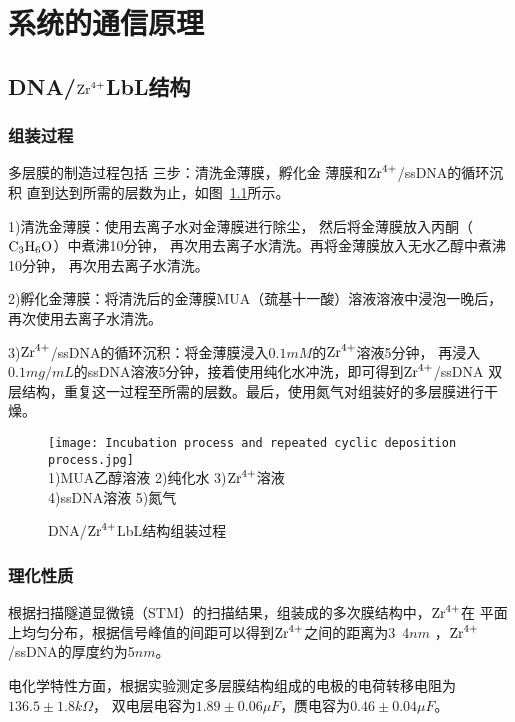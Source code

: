 \chapter{系统的通信原理}

\section{DNA/$\ce{Zr^{4+}}$LbL结构}
\subsection{组装过程}
多层膜的制造过程包括
三步：清洗金薄膜，孵化金
薄膜和$\ce{Zr^{4+}}$/ssDNA的循环沉积
直到达到所需的层数为止，如图~\ref{fig:incubation_process}所示。

1)清洗金薄膜：使用去离子水对金薄膜进行除尘，
然后将金薄膜放入丙酮（$\ce{C3H6O}$）中煮沸10分钟，
再次用去离子水清洗。再将金薄膜放入无水乙醇中煮沸10分钟，
再次用去离子水清洗。

2)孵化金薄膜：将清洗后的金薄膜MUA（巯基十一酸）溶液溶液中浸泡一晚后，
再次使用去离子水清洗。

3)$\ce{Zr^{4+}}$/ssDNA的循环沉积：将金薄膜浸入$0.1mM$的$\ce{Zr^{4+}}$溶液5分钟，
再浸入$0.1mg/mL$的ssDNA溶液5分钟，接着使用纯化水冲洗，即可得到$\ce{Zr^{4+}}$/ssDNA
双层结构，重复这一过程至所需的层数。最后，使用氮气对组装好的多层膜进行干燥。

\begin{figure}[H]
    \centering
    \texttt{[image: Incubation process and repeated cyclic deposition process.jpg]}\\
    1)MUA乙醇溶液 2)纯化水 3)$\ce{Zr^{4+}}$溶液 \\
    4)ssDNA溶液 5)氮气\\
    \caption{DNA/$\ce{Zr^{4+}}$LbL结构组装过程}
    \label{fig:incubation_process}
\end{figure}

\subsection{理化性质}
根据扫描隧道显微镜（STM）的扫描结果，组装成的多次膜结构中，$\ce{Zr^{4+}}$在
平面上均匀分布，根据信号峰值的间距可以得到$\ce{Zr^{4+}}$之间的距离为3~4$nm$
，$\ce{Zr^{4+}}$/ssDNA的厚度约为5$nm$\cite{Shervedani2011Electrochemical}。

电化学特性方面，根据实验测定\cite{Karimi2011}多层膜结构组成的电极的电荷转移电阻为$136.5\pm1.8k\Omega$，
双电层电容为$1.89\pm0.06\mu F$，赝电容为$0.46\pm0.04\mu F$。


